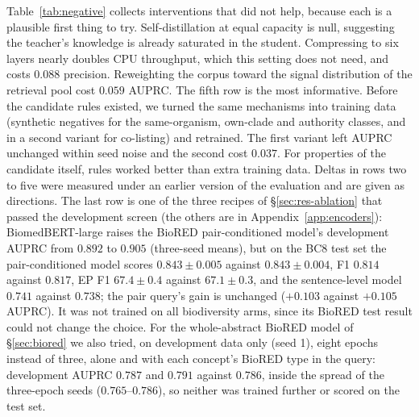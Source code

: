 \documentclass[11pt]{article}
\begin{document}
Table~\ref{tab:negative} collects interventions that did not help, because each is a plausible first
thing to try. Self-distillation at equal capacity is null, suggesting the teacher's knowledge is
already saturated in the student. Compressing to six layers nearly doubles CPU throughput, which this setting does not need, and costs $0.088$ precision. Reweighting the corpus toward the signal distribution of the retrieval
pool cost $0.059$ AUPRC. The fifth row is the most informative. Before the candidate rules existed, we
turned the same mechanisms into training data (synthetic negatives for the same-organism,
own-clade and authority classes, and in a second variant for co-listing) and retrained. The first
variant left AUPRC unchanged within seed noise and the second cost $0.037$. For properties of the candidate itself, rules worked better than extra training data. Deltas in
rows two to five were measured under an earlier version of the evaluation and are given as
directions. The last row is one of the three recipes of \S\ref{sec:res-ablation} that passed the
development screen (the others are in Appendix~\ref{app:encoders}): BiomedBERT-large raises the
BioRED pair-conditioned model's development AUPRC from $0.892$ to $0.905$ (three-seed means), but on
the BC8 test set the pair-conditioned model scores $0.843 \pm 0.005$ against $0.843 \pm 0.004$, F1
$0.814$ against $0.817$, EP F1 $67.4 \pm 0.4$ against $67.1 \pm 0.3$, and the sentence-level model
$0.741$ against $0.738$; the pair query's gain is unchanged ($+0.103$ against $+0.105$ AUPRC). It was
not trained on all biodiversity arms, since its BioRED test result could not change the choice.
For the whole-abstract BioRED model of \S\ref{sec:biored} we also tried, on development data only
(seed 1), eight epochs instead of three, alone and with each concept's BioRED type in the query:
development AUPRC $0.787$ and $0.791$ against $0.786$, inside the spread of the three-epoch seeds
($0.765$--$0.786$), so neither was trained further or scored on the test set.
\end{document}
